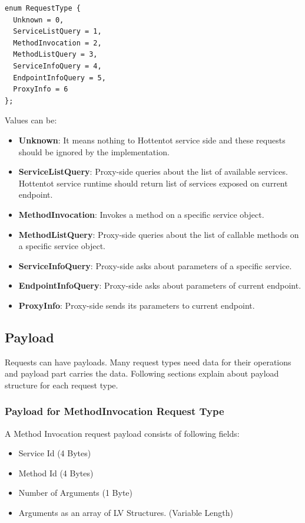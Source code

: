 \documentclass[10pt,a4paper]{article}
\begin{document}
\begin{verbatim}
enum RequestType { 
  Unknown = 0, 
  ServiceListQuery = 1, 
  MethodInvocation = 2,
  MethodListQuery = 3,
  ServiceInfoQuery = 4,
  EndpointInfoQuery = 5,
  ProxyInfo = 6
};
\end{verbatim}

\noindent
Values can be:
\begin{itemize}
  \item \textbf{Unknown}: It means nothing to Hottentot service side and these requests should be ignored by the implementation.
  \item \textbf{ServiceListQuery}: Proxy-side queries about the list of available services. Hottentot service runtime should return list of services exposed on current endpoint.
  \item \textbf{MethodInvocation}: Invokes a method on a specific service object.
  \item \textbf{MethodListQuery}: Proxy-side queries about the list of callable methods on a specific service object.
  \item \textbf{ServiceInfoQuery}: Proxy-side asks about parameters of a specific service.
  \item \textbf{EndpointInfoQuery}: Proxy-side asks about parameters of current endpoint.
  \item \textbf{ProxyInfo}: Proxy-side sends its parameters to current endpoint.
\end{itemize}

\subsection {Payload}
Requests can have payloads. Many request types need data for their operations and payload part carries the data. Following sections explain about payload structure for each request type.
\subsubsection {Payload for MethodInvocation Request Type}
A Method Invocation request payload consists of following fields:
\begin{itemize}
  \item Service Id (4 Bytes)
  \item Method Id (4 Bytes)
  \item Number of Arguments (1 Byte)
  \item Arguments as an array of LV Structures. (Variable Length)
\end{itemize}
\end{document}
